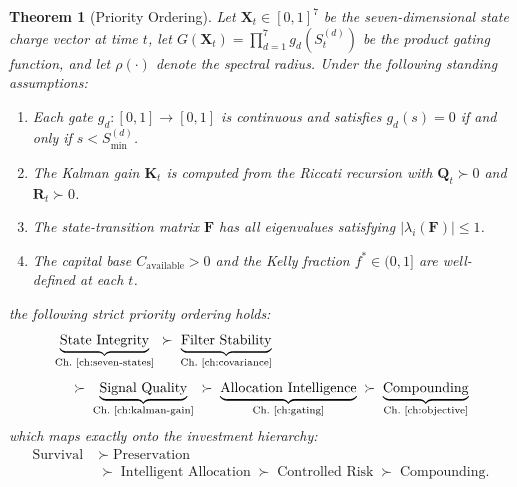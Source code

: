 \documentclass[12pt,openany]{book}
\numberwithin{equation}{chapter}
\theoremstyle{plain}
\newtheorem{theorem}{Theorem}[chapter]
\theoremstyle{definition}
\theoremstyle{remark}
\def\mathcal#1{#1}%
\begin{document}
\begin{theorem}[Priority Ordering]
\label{thm:priority}
Let $\mathbf{X}_t \in [0,1]^7$ be the seven-dimensional state
charge vector at time $t$, let $G(\mathbf{X}_t)=\prod_{d=1}^7
g_d(\mathcal{S}_t^{(d)})$ be the product gating function, and
let $\rho(\cdot)$ denote the spectral radius.  Under the
following standing assumptions:
\begin{enumerate}
  \item[\textbf{(A1)}] Each gate $g_d:[0,1]\to[0,1]$ is
        continuous and satisfies $g_d(s)=0$ if and only if
        $s < \mathcal{S}_{\min}^{(d)}$.
  \item[\textbf{(A2)}] The Kalman gain $\mathbf{K}_t$ is
        computed from the Riccati recursion with
        $\mathbf{Q}_t \succ 0$ and $\mathbf{R}_t \succ 0$.
  \item[\textbf{(A3)}] The state-transition matrix
        $\mathbf{F}$ has all eigenvalues satisfying
        $|\lambda_i(\mathbf{F})| \leq 1$.
  \item[\textbf{(A4)}] The capital base $C_{\mathrm{available}}>0$
        and the Kelly fraction $f^* \in (0,1]$ are well-defined
        at each $t$.
\end{enumerate}
the following strict priority ordering holds:
\begin{align}
  &\underbrace{\text{State Integrity}}_{\text{Ch.~\ref{ch:seven-states}}}
  \;\succ\;
  \underbrace{\text{Filter Stability}}_{\text{Ch.~\ref{ch:covariance}}}
  \nonumber\\[4pt]
  &\quad\;\succ\;
  \underbrace{\text{Signal Quality}}_{\text{Ch.~\ref{ch:kalman-gain}}}
  \;\succ\;
  \underbrace{\text{Allocation Intelligence}}_{\text{Ch.~\ref{ch:gating}}}
  \;\succ\;
  \underbrace{\text{Compounding}}_{\text{Ch.~\ref{ch:objective}}}
  \label{eq:priority-ordering}
\end{align}
which maps exactly onto the investment hierarchy:
\begin{align}
  \text{Survival}
  &\;\succ\; \text{Preservation}
  \nonumber\\[4pt]
  &\;\succ\; \text{Intelligent Allocation}
  \;\succ\; \text{Controlled Risk}
  \;\succ\; \text{Compounding}.
  \label{eq:investment-priority}
\end{align}
\end{theorem}
\end{document}
